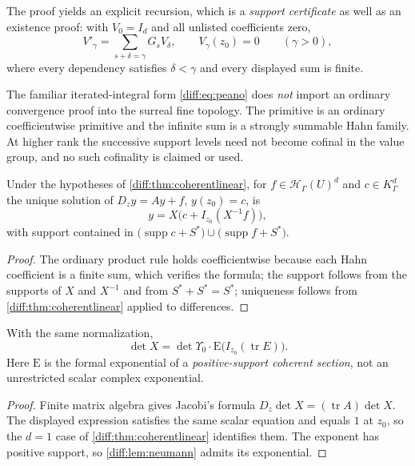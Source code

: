 \documentclass[11pt,letterpaper]{article}
\numberwithin{equation}{section}
\theoremstyle{definition}
\theoremstyle{remark}
\newcommand{\supp}{\operatorname{supp}}
\newcommand{\Emm}{\mathrm{E}}
\newcommand{\Hring}{\mathscr H}
\newcommand{\Dz}{D_{z}}
\newcommand{\tr}{\operatorname{tr}}
\begin{document}
The proof yields an explicit recursion, which is a \emph{support certificate}
as well as an existence proof: with $V_{0}=I_{d}$ and all unlisted
coefficients zero,
\begin{equation}\label{diff:eq:linearrecursion}
 V'_{\gamma}=\sum_{s+\delta=\gamma}G_{s}V_{\delta},
 \qquad V_{\gamma}(z_{0})=0 \qquad(\gamma>0),
\end{equation}
where every dependency satisfies $\delta<\gamma$ and every displayed sum is
finite.

\begin{warning}
\label{diff:warn:notpicard}
The familiar iterated-integral form \cref{diff:eq:peano} does \emph{not}
import an ordinary convergence proof into the surreal fine topology. The
primitive is an ordinary coefficientwise primitive and the infinite sum is a
strongly summable Hahn family. At higher rank the successive support levels
need not become cofinal in the value group, and no such cofinality is claimed
or used.
\end{warning}

\begin{corollary}
\label{diff:cor:coherentinhom}
Under the hypotheses of \cref{diff:thm:coherentlinear}, for
$f\in\Hring_{\Gamma}(U)^{d}$ and $c\in K_{\Gamma}^{d}$ the unique solution of
$\Dz y=Ay+f$, $y(z_{0})=c$, is
\[
 y=X\bigl(c+I_{z_{0}}(X^{-1}f)\bigr),
\]
with support contained in
$\bigl(\supp c+S^{*}\bigr)\cup\bigl(\supp f+S^{*}\bigr)$.
\end{corollary}
\begin{proof}
The ordinary product rule holds coefficientwise because each Hahn coefficient
is a finite sum, which verifies the formula; the support follows from the
supports of $X$ and $X^{-1}$ and from $S^{*}+S^{*}=S^{*}$; uniqueness follows
from \cref{diff:thm:coherentlinear} applied to differences.
\end{proof}

\begin{corollary}
\label{diff:cor:determinant}
With the same normalization,
\[
 \det X=\det\Upsilon_{0}\cdot\Emm\bigl(I_{z_{0}}(\tr E)\bigr).
\]
Here $\Emm$ is the formal exponential of a \emph{positive-support coherent
section}, not an unrestricted scalar complex exponential.
\end{corollary}
\begin{proof}
Finite matrix algebra gives Jacobi's formula $\Dz\det X=(\tr A)\det X$. The
displayed expression satisfies the same scalar equation and equals $1$ at
$z_{0}$, so the $d=1$ case of \cref{diff:thm:coherentlinear} identifies them.
The exponent has positive support, so \cref{diff:lem:neumann} admits its
exponential.
\end{proof}
\end{document}
